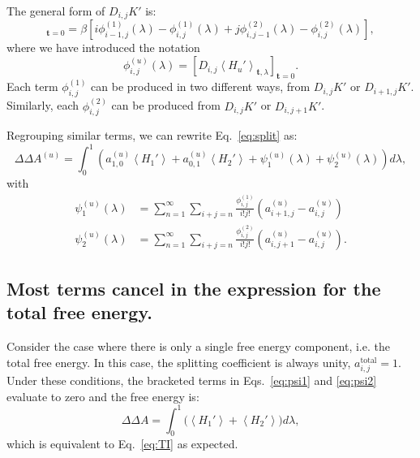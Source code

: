 \documentclass{article}
\let\vec\mathbf
\begin{document}
The general form of $D_{i,j}K'$ is:
\begin{equation}
[D_{i,j}K_\lambda']_{\vec t=0} =
	\beta\left[
		i \phi_{i-1, j}^{(1)}(\lambda) -
    	\phi_{i,j}^{(1)}(\lambda) +
    	j \phi_{i, j-1}^{(2)}(\lambda) -
    	\phi_{i,j}^{(2)}(\lambda)
    \right],
\label{eq:deriv}
\end{equation}
where we have introduced the notation
\begin{equation}
\phi_{i,j}^{(u)}(\lambda) =
	\left[ D_{i,j} \left\langle
    	H_u'
    \right\rangle_{\vec t, \lambda} \right]_{\vec t=0}.
\end{equation}
Each term $\phi_{i,j}^{(1)}$ can be produced in two different ways, from $D_{i,j}K'$ or $D_{i+1,j}K'$. Similarly, each $\phi_{i,j}^{(2)}$ can be produced from $D_{i,j}K'$ or $D_{i,j+1}K'$.

Regrouping similar terms, we can rewrite Eq.~\ref{eq:split} as:
\begin{equation}
\Delta\Delta A^{(u)} =
	\int_0^1 \left(
        a_{1,0}^{(u)}\left\langle H_1' \right\rangle +
        a_{0,1}^{(u)}\left\langle H_2' \right\rangle +
        \psi_1^{(u)}(\lambda) +
        \psi_2^{(u)}(\lambda)
    \right) d\lambda,
\label{eq:dA_expansion}
\end{equation}
with
\begin{align}
\psi_1^{(u)}(\lambda) &=
	\sum_{n=1}^{\infty}
    \sum_{i+j=n}
        \frac{\phi_{i,j}^{(1)}}{i!j!}
        \left(
            {a_{i+1,j}^{(u)}} -
            {a_{i,j}^{(u)}}
        \right) \label{eq:psi1}\\
\psi_2^{(u)}(\lambda) &=
	\sum_{n=1}^{\infty}
    \sum_{i+j=n}
        \frac{\phi_{i,j}^{(2)}}{i!j!}
        \left(
            a_{i,j+1}^{(u)} -
            a_{i,j}^{(u)}
      	\right)\label{eq:psi2}.
\end{align}



\subsection{Most terms cancel in the expression for the total free energy.}

Consider the case where there is only a single free energy component, i.e. the total free energy. In this case, the splitting coefficient is always unity, $a_{i,j}^\mathrm{total}=1$. Under these conditions, the bracketed terms in Eqs.~\ref{eq:psi1} and \ref{eq:psi2} evaluate to zero and the free energy is:
\begin{equation}
\Delta\Delta A = \int_0^1 \bigg(
	\left\langle H_1' \right\rangle +
    \left\langle H_2' \right\rangle
\bigg) d\lambda,
\end{equation}
which is equivalent to Eq.~\ref{eq:TI} as expected.
\end{document}
